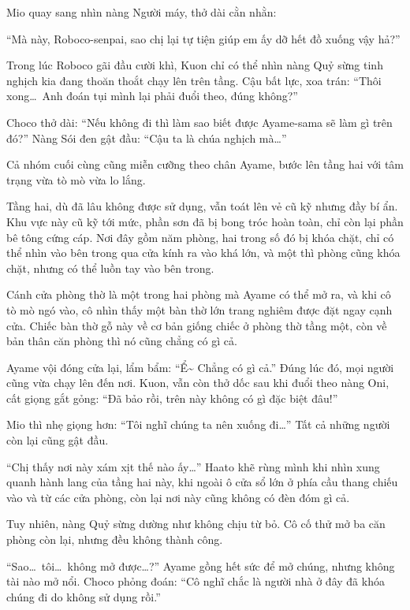 \documentclass[../main.tex]{subfiles}
\begin{document}
Mio quay sang nhìn nàng Người máy, thở dài cằn nhằn:

``Mà này, Roboco-senpai, sao chị lại tự tiện giúp em ấy dỡ hết đồ xuống vậy hả?''



Trong lúc Roboco gãi đầu cười khì, Kuon chỉ có thể nhìn nàng Quỷ sừng tinh nghịch kia đang thoăn thoắt chạy lên trên tầng. Cậu bất lực, xoa trán: ``Thôi xong\dots\ Anh đoán tụi mình lại phải đuổi theo, đúng không?''

Choco thở dài: ``Nếu không đi thì làm sao biết được Ayame-sama sẽ làm gì trên đó?'' Nàng Sói đen gật đầu: ``Cậu ta là chúa nghịch mà\dots''

Cả nhóm cuối cùng cũng miễn cưỡng theo chân Ayame, bước lên tầng hai với tâm trạng vừa tò mò vừa lo lắng.

\ct

Tầng hai, dù đã lâu không được sử dụng, vẫn toát lên vẻ cũ kỹ nhưng đầy bí ẩn. Khu vực này cũ kỹ tới mức, phần sơn đã bị bong tróc hoàn toàn, chỉ còn lại phần bê tông cứng cáp. Nơi đây gồm năm phòng, hai trong số đó bị khóa chặt, chỉ có thể nhìn vào bên trong qua cửa kính ra vào khá lớn, và một thì phòng cũng khóa chặt, nhưng có thể luồn tay vào bên trong.

Cánh cửa phòng thờ là một trong hai phòng mà Ayame có thể mở ra, và khi cô tò mò ngó vào, cô nhìn thấy một bàn thờ lớn trang nghiêm được đặt ngay cạnh cửa. Chiếc bàn thờ gỗ này về cơ bản giống chiếc ở phòng thờ tầng một, còn về bản thân căn phòng thì nó cũng chẳng có gì cả.

Ayame vội đóng cửa lại, lẩm bẩm: ``Ể\~{} Chẳng có gì cả.'' Đúng lúc đó, mọi người cũng vừa chạy lên đến nơi. Kuon, vẫn còn thở dốc sau khi đuổi theo nàng Oni, cất giọng gắt gỏng: ``Đã bảo rồi, trên này không có gì đặc biệt đâu!''

Mio thì nhẹ giọng hơn: ``Tôi nghĩ chúng ta nên xuống đi\dots'' Tất cả những người còn lại cũng gật đầu.

``Chị thấy nơi này xám xịt thế nào ấy\dots'' Haato khẽ rùng mình khi nhìn xung quanh hành lang của tầng hai này, khi ngoài ô cửa sổ lớn ở phía cầu thang chiếu vào và từ các cửa phòng, còn lại nơi này cũng không có đèn đóm gì cả.

Tuy nhiên, nàng Quỷ sừng dường như không chịu từ bỏ. Cô cố thử mở ba căn phòng còn lại, nhưng đều không thành công.

``Sao\dots\ tôi\dots\ không mở được\dots?'' Ayame gồng hết sức để mở chúng, nhưng không tài nào mở nổi. Choco phỏng đoán: ``Cô nghĩ chắc là người nhà ở đây đã khóa chúng đi do không sử dụng rồi.''
\end{document}
